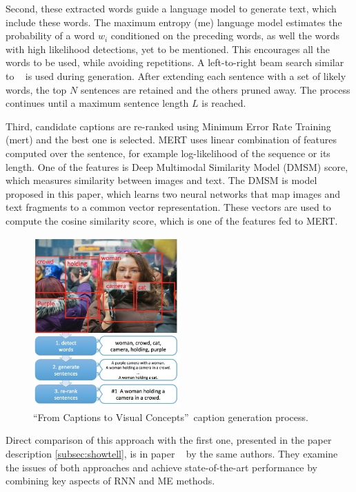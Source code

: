 Second, these extracted words guide a language model to generate text, which include these words. The maximum entropy (\gls{me}) language model estimates the probability of a word $ w_i $ conditioned on the preceding words, as well the words with high likelihood detections, yet to be mentioned. This encourages all the words to be used, while avoiding repetitions. A left-to-right beam search similar to ~\cite{DBLP:journals/corr/cs-CL-0006028} is used during generation. After extending each sentence with a set of likely words, the top $ N $  sentences are retained and the others pruned away. The process continues until a maximum sentence length $ L $ is reached.

Third, candidate captions are re-ranked using Minimum Error Rate Training~\cite{och2003minimum} (\gls{mert}) and the best one is selected. MERT uses linear combination of features computed over the sentence, for example log-likelihood of the sequence or its length. One of the features is Deep Multimodal Similarity Model (DMSM) score, which measures similarity between images and text. The DMSM is model proposed in this paper, which learns two neural networks that map images and text fragments to a common vector representation. These vectors are used to compute the cosine similarity score, which is one of the features fed to MERT.

\begin{figure}[!t]
	\centering
	\includegraphics[width=0.5\textwidth]{./fig/from-captions-workflow.png}
	\caption{\textquotedblleft From Captions to Visual Concepts\textquotedblright\ caption generation process.~\cite{DBLP:journals/corr/FangGISDDGHMPZZ14}
		\label{fig:fromCaptionsModel}}
\end{figure}

Direct comparison of this approach with the first one, presented in the paper description \ref{subsec:showtell}, is in paper ~\cite{DBLP:journals/corr/DevlinCFGDHZM15} by the same authors. They examine the issues of both approaches and achieve state-of-the-art performance by combining key aspects of RNN and ME methods.

